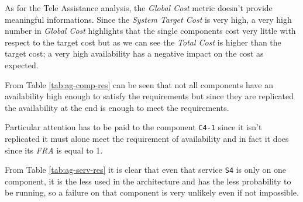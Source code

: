 As for the Tele Assistance analysis, the \emph{Global Cost} metric doesn't provide meaningful informations. Since the \emph{System Target Cost} is very high, a very high number in \emph{Global Cost} highlights that the single components cost very little with respect to the target cost but as we can see the \emph{Total Cost} is higher than the target cost; a very high availability has a negative impact on the cost as expected. 

From Table \ref{tab:ag-comp-res} can be seen that not all components have an availability high enough to satisfy the requirements but since they are replicated the availability at the end is enough to meet the requirements.

Particular attention has to be paid to the component \texttt{C4-1} since it isn't replicated it must alone meet the requirement of availability and in fact it does since its \emph{FRA} is equal to 1.

From Table \ref{tab:ag-serv-res} it is clear that even that service \texttt{S4} is only on one component, it is the less used in the architecture and has the less probability to be running, so a failure on that component is very unlikely even if not impossible.